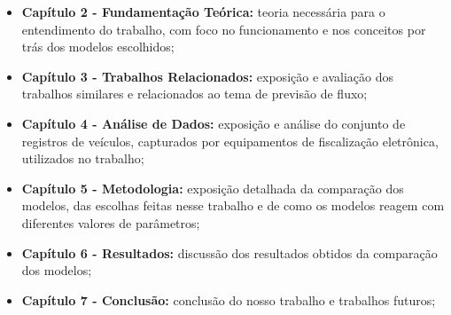 \begin{itemize}
    \item \textbf{Capítulo 2 - Fundamentação Teórica:} teoria necessária para o entendimento do trabalho, com foco no funcionamento e nos conceitos por trás dos modelos escolhidos;
    \item \textbf{Capítulo 3 - Trabalhos Relacionados:} exposição e avaliação dos trabalhos similares e relacionados ao tema de previsão de fluxo;
    \item \textbf{Capítulo 4 - Análise de Dados:} exposição e análise do conjunto de registros de veículos, capturados por equipamentos de fiscalização eletrônica, utilizados no trabalho;
    \item \textbf{Capítulo 5 - Metodologia:} exposição detalhada da comparação dos modelos, das escolhas feitas nesse trabalho e de como os modelos reagem com diferentes valores de parâmetros;
    \item \textbf{Capítulo 6 - Resultados:} discussão dos resultados obtidos da comparação dos modelos;
    \item \textbf{Capítulo 7 - Conclusão:} conclusão do nosso trabalho e trabalhos futuros;
\end{itemize}
